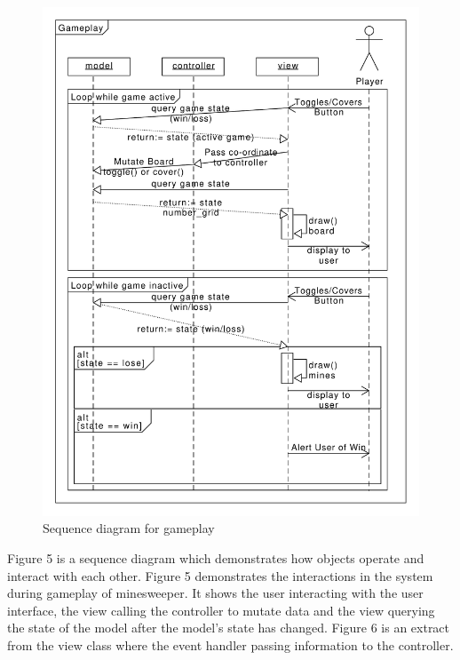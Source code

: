 \documentclass[12pt, a4]{report}
\begin{document}
\newpage
%
%
\begin{figure}[!h]
	\centering
	\includegraphics[scale=0.7]{SequenceDiagram}
	\caption{Sequence diagram for gameplay}
\end{figure}
Figure 5 is a sequence diagram which demonstrates how objects operate and interact with each other. Figure 5 demonstrates the interactions in the system during gameplay of minesweeper. It shows the user interacting with the user interface, the view calling the controller to mutate data and the view querying the state of the model after the model's state has changed. Figure 6 is an extract from the view class where the event handler passing information to the controller.
\end{document}
